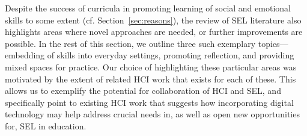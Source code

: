 \documentclass[prodmode,acmtochi]{acmsmall}
\newcommand{\GeraldineFIXNEW}[1]{}
\begin{document}
Despite the success of curricula in promoting learning of social and emotional skills to some extent (cf. Section~\ref{sec:reasons}), the review of SEL literature also highlights areas where novel approaches are needed, or further improvements are possible. In the rest of this section, we outline three such exemplary topics---embedding of skills into everyday settings, promoting reflection, and providing mixed spaces for practice. Our choice of highlighting these particular areas was motivated by the extent of related HCI work that exists for each of these. This allows us to exemplify the potential for collaboration of HCI and SEL, and specifically point to existing HCI work that suggests how incorporating digital technology may help address crucial needs in, as well as open new opportunities for, SEL in education. 




\GeraldineFIXNEW{GF NOTE: do you need to make it clearer what the challenges are and then also be clearer that you are structuring this discussion more by relevant work in HCI than the SEL categories you pulled out earlier? Otherwise raises questions about why these categories for this discussion???}


%
\end{document}
